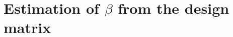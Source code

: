 \documentclass[article]{jss}
\begin{document}
\section{Estimation of $\beta$ from the design matrix}
\end{document}
